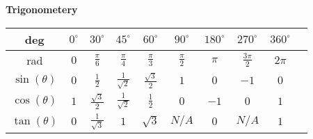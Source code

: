 \textbf{Trigonometery} \\
\begin{tabular}{c|c|c|c|c|c|c|c|c|c}

deg
& \( 0^\circ   \)
& \( 30^\circ  \)
& \( 45^\circ  \)
& \( 60^\circ  \)
& \( 90^\circ  \)
& \( 180^\circ \)
& \( 270^\circ \)
& \( 360^\circ \)
\\ \midrule

rad
& \( 0              \)
& \( \frac{\pi}{6}  \)
& \( \frac{\pi}{4}  \)
& \( \frac{\pi}{3}  \)
& \( \frac{\pi}{2}  \)
& \( \pi            \)
& \( \frac{3\pi}{2} \)
& \( 2\pi           \)
\\ \midrule

\( \sin(\theta)         \)
& \( 0                  \)
& \( \frac{1}{2}        \)
& \( \frac{1}{\sqrt{2}} \)
& \( \frac{\sqrt{3}}{2} \)
& \( 1                  \)
& \( 0                  \)
& \( -1                 \)
& \( 0                  \)
\\ \midrule

\( \cos(\theta)         \)
& \( 1                  \)
& \( \frac{\sqrt{3}}{2} \)
& \( \frac{1}{\sqrt{2}} \)
& \( \frac{1}{2}        \)
& \( 0                  \)
& \( -1                 \)
& \( 0                  \)
& \( 1                  \)
\\ \midrule

\( \tan(\theta)         \)
& \( 0                  \)
& \( \frac{1}{\sqrt{3}} \)
& \( 1                  \)
& \( \sqrt{3}           \)
& \( N/A                \)
& \( 0                  \)
& \( N/A                \)
& \( 1                  \)
\\ \midrule

\end{tabular}




\sectionend

